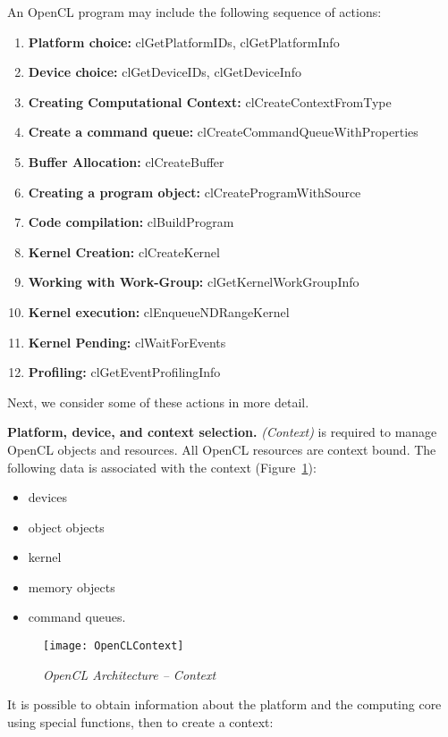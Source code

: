 {	
		\par An OpenCL program may include the following sequence of actions:
		\begin{enumerate}
			\item\textbf{Platform choice:} clGetPlatformIDs, clGetPlatformInfo
			\item\textbf{Device choice:} clGetDeviceIDs, clGetDeviceInfo
			\item\textbf{Creating Computational Context:} clCreateContextFromType
			\item\textbf{Create a command queue:} clCreateCommandQueueWithProperties
			\item\textbf{Buffer Allocation:} clCreateBuffer
			\item\textbf{Creating a program object:} clCreateProgramWithSource
			\item\textbf{Code compilation:} clBuildProgram
			\item\textbf{Kernel Creation:} clCreateKernel
			\item\textbf{Working with Work-Group:} clGetKernelWorkGroupInfo 
			\item\textbf{Kernel execution:} clEnqueueNDRangeKernel 
			\item\textbf{Kernel Pending:} clWaitForEvents 
			\item\textbf{Profiling:} clGetEventProfilingInfo
		\end{enumerate}
Next, we consider some of these actions in more detail.
	\par\textbf{Platform, device, and context selection.}  \textit{(Context)} is required to manage OpenCL objects and resources. All OpenCL resources are context bound. The following data is associated with the context (Figure~\ref{OpenCLContext:image}):
		\begin{itemize}
		\item devices
		\item object objects
		\item kernel
		\item memory objects
		\item command queues.
		\end{itemize}
	\begin{figure}[H]
		\texttt{[image: OpenCLContext]}
		\caption{\textit{OpenCL Architecture – Context}}
		\label{OpenCLContext:image}
	\end{figure}
It is possible to obtain information about the platform and the computing core using special functions, then to create a context:
		\begin{itemize}

\end{itemize}}
